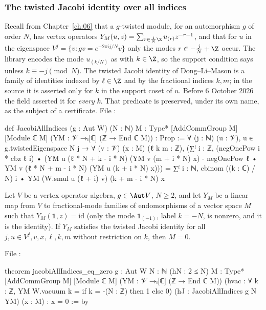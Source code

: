 \subsubsection{The twisted Jacobi identity over all indices}\label{ch15:sec:twisted}

Recall from Chapter~\ref{ch:06} that a $g$-twisted module, for an automorphism $g$ of order $N$,
has vertex operators $Y_M(u,z)=\sum_{r\in\frac1N\Z}u_{(r)}z^{-r-1}$, and that for $u$ in the
eigenspace $V^j=\{v: gv=e^{-2\pi i j/N}v\}$ only the modes $r\in -\frac jN+\Z$ occur. The library
encodes the mode $u_{(k/N)}$ as  with $k\in\Z$, so the support condition says
 unless $k\equiv -j\pmod N$. The twisted Jacobi identity of Dong--Li--Mason is a
family of identities indexed by $\ell\in\Z$ and by the fractional indices $k,m$; in the source it is
asserted only for $k$ in the support coset of $u$. Before 6 October 2026 the field
 asserted it for \emph{every} $k$. That predicate is preserved, under its
own name, as the subject of a certificate. File :
\begin{leancode}
def JacobiAllIndices (g : Aut W) (N : ℕ) {M : Type*} [AddCommGroup M] [Module ℂ M]
    (YM : 𝒱 →ₗ[ℂ] (ℤ → End ℂ M)) : Prop :=
  ∀ (j : ℕ) (u : 𝒱), u ∈ g.twistedEigenspace N j → ∀ (v : 𝒱) (x : M) (ℓ k m : ℤ),
    (∑ᶠ i : ℤ, (negOnePow i * cbz ℓ i) •
        (YM u (ℓ * N + k - i * N) (YM v (m + i * N) x)
          - negOnePow ℓ • YM v (ℓ * N + m - i * N) (YM u (k + i * N) x)))
      = ∑ᶠ i : ℕ, cbinom ((k : ℂ) / N) i • YM (W.smul u (ℓ + i) v) (k + m - i * N) x
\end{leancode}

\begin{theorem}[The all-indices twisted Jacobi identity forces $M=0$]\label{ch15:thm:jacobiAll}
Let $V$ be a vertex operator algebra, $g\in\Aut V$, $N\ge 2$, and let $Y_M$ be a linear map from $V$
to fractional-mode families of endomorphisms of a vector space $M$ such that $Y_M(\mathbf 1,z)=\mathrm{id}$
(only the mode $\mathbf 1_{(-1)}$, label $k=-N$, is nonzero, and it is the identity). If $Y_M$
satisfies the twisted Jacobi identity for all $j,u\in V^j,v,x,\ell,k,m$ without restriction on $k$,
then $M=0$.
\end{theorem}

File :
\begin{leancode}
theorem jacobiAllIndices_eq_zero {g : Aut W} {N : ℕ} (hN : 2 ≤ N) {M : Type*}
    [AddCommGroup M] [Module ℂ M] (YM : 𝒱 →ₗ[ℂ] (ℤ → End ℂ M))
    (hvac : ∀ k : ℤ, YM W.vacuum k = if k = -(N : ℤ) then 1 else 0)
    (hJ : JacobiAllIndices g N YM) (x : M) : x = 0 := by
\end{leancode}

